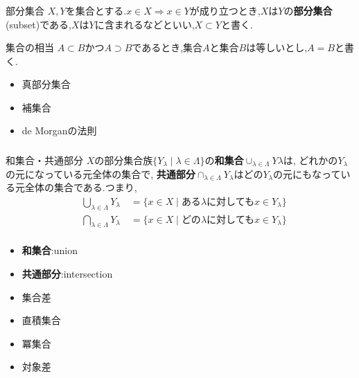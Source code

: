 \documentclass[dvipdfmx,b4j]{jsarticle}
\begin{document}
\subsubsection{}
\begin{definition}{部分集合}{}
$X,Y$を集合とする.$x\in X\Longrightarrow x\in Y$が成り立つとき,$X$は$Y$の\textbf{部分集合}(subset)である,$X$は$Y$に含まれるなどといい,$X\subset Y$と書く.
\end{definition}
\begin{definition}{集合の相当}{}
$A\subset B $かつ$A\supset B$であるとき,集合$A$と集合$B$は等しいとし,$A = B $と書く.
\end{definition}
\begin{itemize}
    \item 真部分集合
    \item 補集合
    \item de Morganの法則
\end{itemize}

\subsubsection{}
\begin{definition}{和集合・共通部分}{}
$X$の部分集合族$\{Y_\lambda\mid\lambda\in\Lambda\}$の\textbf{和集合}$\cup_{\lambda\in\Lambda}Y\lambda$は,
どれかの$Y_\lambda$の元になっている元全体の集合で,
\textbf{共通部分}$\cap_{\lambda\in\Lambda}Y_\lambda$はどの$Y_\lambda$の元にもなっている元全体の集合である.つまり,
\begin{align*}
&\bigcup_{\lambda\in\Lambda}Y_\lambda\quad=\{x\in X\mid \text{ある}\lambda\text{に対しても}x\in Y_\lambda\}\\
&\bigcap_{\lambda\in\Lambda}Y_\lambda\quad=\{x\in X\mid \text{どの}\lambda\text{に対しても}x\in Y_\lambda\}\\
\end{align*}
\tcbline
\begin{itemize}
    \item \textbf{和集合}:union
    \item \textbf{共通部分}:intersection
\end{itemize}
\end{definition}
\begin{itemize}
\item 集合差
\item 直積集合
\item 冪集合
\item 対象差
\end{itemize}
\end{document}
